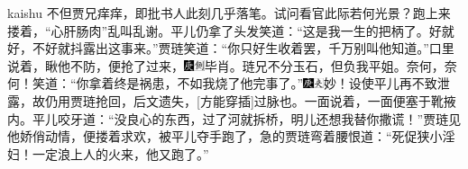 {kaishu 不但贾兄痒痒，即批书人此刻几乎落笔。试问看官此际若何光景？}跑上来搂着，“心肝肠肉”乱叫乱谢。平儿仍拿了头发笑道：“这是我一生的把柄了。好就好，不好就抖露出这事来。”贾琏笑道：“你只好生收着罢，千万别叫他知道。”口里说着，瞅他不防，便抢了过来，{\includegraphics[width=3mm]{../Images/00004}\includegraphics[width=3mm]{../Images/00011}\footnotesize \kaishu 毕肖。琏兄不分玉石，但负我平姐。奈何，奈何！}笑道：“你拿着终是祸患，不如我烧了他完事了。”{\includegraphics[width=3mm]{../Images/00004}\includegraphics[width=3mm]{../Images/00012}\footnotesize \kaishu 妙！设使平儿再不致泄露，故仍用贾琏抢回，后文遗失，{[}方能穿插{]}过脉也。}一面说着，一面便塞于靴掖内。平儿咬牙道：“没良心的东西，过了河就拆桥，明儿还想我替你撒谎！”贾琏见他娇俏动情，便搂着求欢，被平儿夺手跑了，急的贾琏弯着腰恨道：“死促狭小淫妇！一定浪上人的火来，他又跑了。”{\incl}
